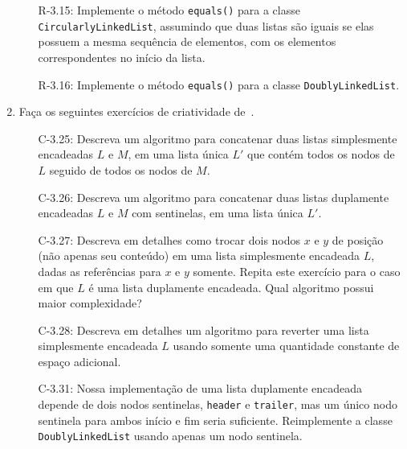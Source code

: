 \begin{enumerate}
\begin{itemize}
		\item[R-3.15:] Implemente o método \texttt{equals()} para a classe \texttt{CircularlyLinkedList}, assumindo que duas listas são iguais se elas possuem a mesma sequência de elementos, com os elementos correspondentes no início da lista.
		
		\item[R-3.16:] Implemente o método \texttt{equals()} para a classe \texttt{DoublyLinkedList}. 
	\end{itemize}
	
	\bigskip
	
	\item Faça os seguintes exercícios de criatividade de~\cite{GoodrichEtAl2014}.
	\begin{itemize}
		\item[C-3.25:] Descreva um algoritmo para concatenar duas listas simplesmente encadeadas $L$ e $M$, em uma lista única $L'$ que contém todos os nodos de $L$ seguido de todos os nodos de $M$.
		
		\item[C-3.26:] Descreva um algoritmo para concatenar duas listas duplamente encadeadas $L$ e $M$ com sentinelas, em uma lista única $L'$.
		
		\item[C-3.27:] Descreva em detalhes como trocar dois nodos $x$ e $y$ de posição (não apenas seu conteúdo) em uma lista simplesmente encadeada $L$, dadas as referências para $x$ e $y$ somente. Repita este exercício para o caso em que $L$ é uma lista duplamente encadeada. Qual algoritmo possui maior complexidade?
		
		\item[C-3.28:] Descreva em detalhes um algoritmo para reverter uma lista simplesmente encadeada $L$ usando somente uma quantidade constante de espaço adicional.
		
		\item[C-3.31:] Nossa implementação de uma lista duplamente encadeada depende de dois nodos sentinelas, \texttt{header} e \texttt{trailer}, mas um único nodo sentinela para ambos início e fim seria suficiente. Reimplemente a classe \texttt{DoublyLinkedList} usando apenas um nodo sentinela.
	\end{itemize}
\end{enumerate}

\clearpage
\medskip

\begingroup
	\footnotesize
	\renewcommand{\chapter}[2]{}%
	
	
\endgroup

